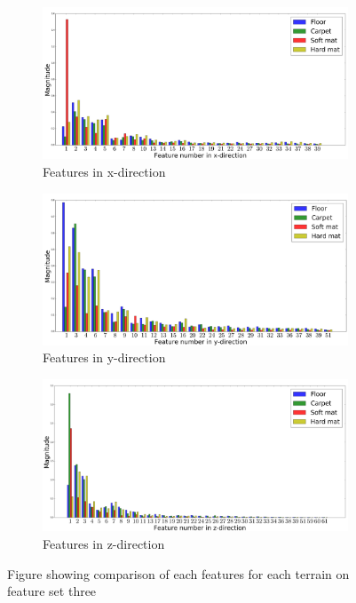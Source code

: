 \documentclass[USenglish]{ifimaster}  %
\begin{document}
\begin{figure} [h]
	\centering
	\begin{subfigure}[b]{\textwidth}
		\includegraphics[width=\textwidth,height=\textheight,keepaspectratio]{Figures/featureselx}
		\caption{Features in x-direction}
		\label{fig:featurex} 
	\end{subfigure}
	
	\begin{subfigure}[b]{\textwidth}
		\includegraphics[width=\textwidth,height=\textheight,keepaspectratio]{Figures/featuresely}
		\caption{Features in y-direction}
		\label{fig:featurey}
	\end{subfigure}
	
	\begin{subfigure}[h]{\textwidth}
		\includegraphics[width=\textwidth,height=\textheight,keepaspectratio]{Figures/featureselz}
		\caption{Features in z-direction}
		\label{fig:featurez}
	\end{subfigure}

	\caption{Figure showing comparison of each features for each terrain on feature set three}
	\label{fig:wrapperset5}
\end{figure}
\FloatBarrier
\end{document}
